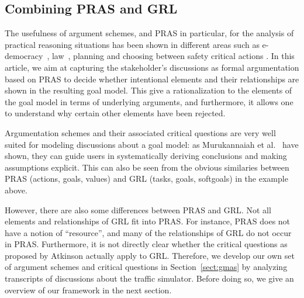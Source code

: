 \subsection{Combining PRAS and GRL}
\label{sect:background:pras:motivation}

The usefulness of argument schemes, and PRAS in particular, for the analysis of practical reasoning situations has been shown in different areas such as e-democracy~\cite{cartwright2009IS}, law~\cite{atkinson2005legal}, planning \cite{medellin2013planning} and choosing between safety critical actions \cite{tolchinsky2012deliberation}. In this article, we aim at capturing the stakeholder's discussions as formal argumentation based on PRAS to decide whether intentional elements and their relationships are shown in the resulting goal model. This give a rationalization to the elements of the goal model in terms of underlying arguments, and furthermore, it allows one to understand why certain other elements have been rejected.

Argumentation schemes and their associated critical questions are very well suited for modeling discussions about a goal model: as Murukannaiah et al.~\cite{murukannaiah2015} have shown, they can guide users in systematically deriving conclusions and making assumptions explicit. This can also be seen from the obvious similaries between PRAS (actions, goals, values) and GRL (tasks, goals, softgoals) in the example above.

However, there are also some differences between PRAS and GRL. Not all elements and relationships of GRL fit into PRAS. For instance, PRAS does not have a notion of ``resource'', and many of the relationships of GRL do not occur in PRAS. Furthermore, it is not directly clear whether the critical questions as proposed by Atkinson actually apply to GRL. Therefore, we develop our own set of argument schemes and critical questions in Section~\ref{sect:gmas} by analyzing transcripts of discussions about the traffic simulator. Before doing so, we give an overview of our framework in the next section.